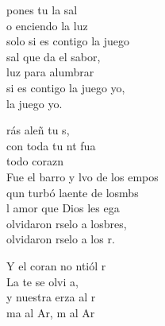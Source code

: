 \documentclass[12pt]{article}
\begin{document}
\begin{multicols*}{2}
\begin{cancion}
\begin{chorus}
	 pones tu la sal \\
	o enciendo la luz\\
	 solo si es contigo  la juego\\
	 sal que da el sabor, \\
	luz para alumbrar\\
	 si es contigo  la juego yo,\\
	 la juego yo.\\
	\end{chorus}%
\end{cancion}%

\begin{cancion}%
	rás aleñ tu s, \\
	con toda tu nt fua\\
	 todo  corazn   \\
	Fue el barro y lvo de los empos\\
	qun turbó laente de losmbs \\
	l amor que Dios les ega \\
	olvidaron rselo a losbres,\\
	olvidaron rselo a los r. \\
	\begin{chorus}%
	Y el coran no ntiól r \\
	La te se olvi a,\\
	y nuestra erza al r\\
	ma al Ar, m al Ar  \\
	\end{chorus}%

\end{cancion}
\end{multicols*}
\end{document}
